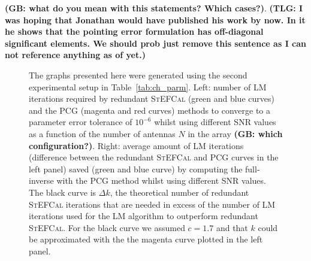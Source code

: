 \documentclass[useAMS,usenatbib]{mn2e}
\begin{document}
{\bf (GB: what do you mean with this statements? Which cases?)}.
{\bf (TLG: I was hoping that Jonathan would have published his work by now. In it he shows that the pointing error 
formulation has off-diagonal significant elements. We should prob just remove this sentence as I can not reference anything 
as of yet.)}

\begin{figure}
\centering
{}
\caption{The graphs presented here were generated using the second experimental setup in Table~\ref{tab:ch_parm}. Left: number of LM iterations required by redundant \textsc{StEFCal} (green and blue curves) and the PCG (magenta and red curves) methods to converge to a parameter error tolerance of $10^{-6}$ whilst using different SNR values as a function of the number of antennas $N$ in the array {\bf (GB: which configuration?)}. Right: average amount of LM iterations (difference between the redundant \textsc{StEFCal} and PCG curves in the left panel) saved (green and blue curve) by computing the full-inverse with the PCG method whilst using different SNR values. The black curve is $\Delta k$, the theoretical number 
of redundant \textsc{StEFCal} iterations that are needed in excess of the number of LM iterations used for the LM algorithm to 
outperform redundant \textsc{StEFCal}. For the black curve we assumed $c=1.7$ and that $k$ could be approximated with the 
the magenta curve plotted in the left panel.
\label{fig:out_diff}} 
\end{figure}
\end{document}
